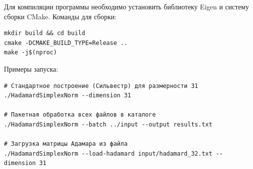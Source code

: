 \documentclass[a4paper,12pt]{article}
\theoremstyle{indented}
\begin{document}
Для компиляции программы необходимо установить библиотеку Eigen и систему сборки CMake. Команды для сборки:

\begin{verbatim}
mkdir build && cd build
cmake -DCMAKE_BUILD_TYPE=Release ..
make -j$(nproc)
\end{verbatim}

Примеры запуска:

\begin{verbatim}
# Стандартное построение (Сильвестр) для размерности 31
./HadamardSimplexNorm --dimension 31

# Пакетная обработка всех файлов в каталоге
./HadamardSimplexNorm --batch ../input --output results.txt

# Загрузка матрицы Адамара из файла
./HadamardSimplexNorm --load-hadamard input/hadamard_32.txt --dimension 31
\end{verbatim}
\end{document}
